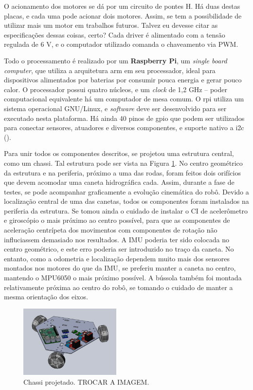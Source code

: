 O acionamento dos motores se dá por um circuito de pontes H. Há duas destas placas, e cada uma pode acionar dois motores. Assim, se tem a possibilidade de utilizar mais um motor em trabalhos futuros. Talvez eu devesse citar as especificações dessas coisas, certo? Cada driver é alimentado com a tensão regulada de 6 V, e o computador utilizado comanda o chaveamento via PWM.

Todo o processamento é realizado por um \textbf{Raspberry Pi}, um \emph{single board computer}, que utiliza a arquitetura \acrshort{arm} em seu processador, ideal para dispositivos alimentados por baterias por consumir pouca energia e gerar pouco calor. O processador possui quatro núcleos, e um \emph{clock} de 1,2 GHz -- poder computacional equivalente há um computador de mesa comum. O \acrshort{rpi} utiliza um sistema operacional GNU/Linux, e \emph{software} deve ser desenvolvido para ser executado nesta plataforma. Há ainda 40 pinos de \acrshort{gpio} que podem ser utilizados para conectar sensores, atuadores e diversos componentes, e suporte nativo a \acrshort{i2c} (\cite{upton2014raspberry}).

Para unir todos os componentes descritos, se projetou uma estrutura central, como um chassi. Tal estrutura pode ser vista na Figura \ref{fig:chassi}. No centro geométrico da estrutura e na periferia, próximo a uma das rodas, foram feitos dois orifícios que devem acomodar uma caneta hidrográfica cada. Assim, durante a fase de testes, se pode acompanhar graficamente a evolução cinemática do robô. Devido a localização central de uma das canetas, todos os componentes foram instalados na periferia da estrutura. Se tomou ainda o cuidado de instalar o CI de acelerômetro e giroscópio o mais próximo ao centro possível, para que as componentes de aceleração centrípeta dos movimentos com componentes de rotação não influciassem demasiado nos resultados. A IMU poderia ter sido colocada no centro geométrico, e este erro poderia ser introduzido no traço da caneta. No entanto, como a odometria e localização dependem muito mais dos sensores montados nos motores do que da IMU, se preferiu manter a caneta no centro, mantendo o MPU6050 o mais próximo possível. A bússola também foi montada relativamente próxima ao centro do robô, se tomando o cuidado de manter a mesma orientação dos eixos.

\begin{figure}[h]
  \centering
  \includegraphics[width = 0.45\textwidth]{imagens/proto01}
  \caption{Chassi projetado. TROCAR A IMAGEM.}
  \label{fig:chassi}
\end{figure}

